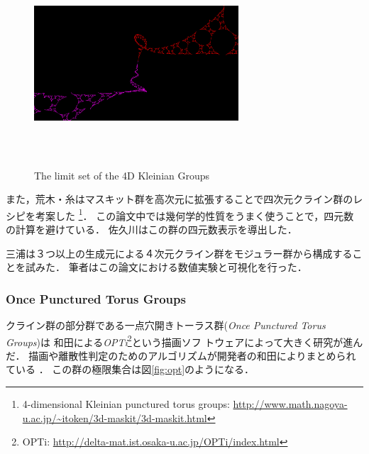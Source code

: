 \begin{figure}[h!tbp]
\begin{minipage}{0.49\hsize}
  \subcaption{}
 \end{minipage}
 \hspace*{\fill}
 \begin{minipage}{0.49\hsize}
  \center
  \includegraphics[width=3in, height=3in, keepaspectratio]{../img/klein/sakugawa4.pdf}
  \subcaption{}
 \end{minipage}
 \caption{The limit set of the 4D Kleinian Groups}
 \label{fig:sakugawa}
\end{figure}

また，荒木・糸はマスキット群を高次元に拡張することで四次元クライン群のレ
シピを考案した\cite{araki2008extension}
\footnote{4-dimensional Kleinian punctured torus groups:
\url{http://www.math.nagoya-u.ac.jp/~itoken/3d-maskit/3d-maskit.html}}．
この論文中では幾何学的性質をうまく使うことで，四元数の計算を避けている．
佐久川はこの群の四元数表示を導出した\cite{sakugawa2010limit}．

三浦は３つ以上の生成元による４次元クライン群をモジュラー群から構成するこ
とを試みた\cite{miura2015master}．
筆者はこの論文における数値実験と可視化を行った．

\subsubsection{Once Punctured Torus Groups}

クライン群の部分群である一点穴開きトーラス群({\it Once Punctured Torus Groups})は
和田による{\it OPTi}\footnote{OPTi:
\url{http://delta-mat.ist.osaka-u.ac.jp/OPTi/index.html}}という描画ソフ
トウェアによって大きく研究が進んだ．
描画や離散性判定のためのアルゴリズムが開発者の和田によりまとめられている
\cite{wada2003optiDrawingLimit}\cite{wada2006optiDiscreteness}．
この群の極限集合は図\ref{fig:opt}のようになる．

